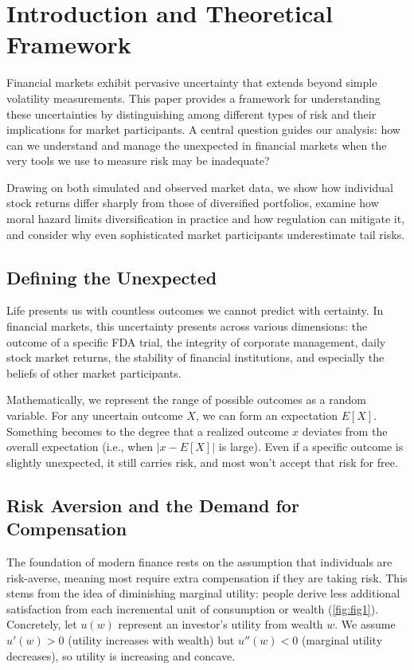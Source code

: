 \section{Introduction and Theoretical Framework}

Financial markets exhibit pervasive uncertainty that extends beyond simple volatility measurements. This paper provides a framework for understanding these uncertainties by distinguishing among different types of risk and their implications for market participants. A central question guides our analysis: how can we understand and manage the unexpected in financial markets when the very tools we use to measure risk may be inadequate?

Drawing on both simulated and observed market data, we show how individual stock returns differ sharply from those of diversified portfolios, examine how moral hazard limits diversification in practice and how regulation can mitigate it, and consider why even sophisticated market participants underestimate tail risks.

\subsection{Defining the Unexpected}
Life presents us with countless outcomes we cannot predict with certainty. In financial markets, this uncertainty presents across various dimensions: the outcome of a specific FDA trial, the integrity of corporate management, daily stock market returns, the stability of financial institutions, and especially the beliefs of other market participants.

Mathematically, we represent the range of possible outcomes as a random variable. For any uncertain outcome $X$, we can form an expectation $E[X]$. Something becomes  to the degree that a realized outcome $x$ deviates from the overall expectation (i.e., when $|x - E[X]|$ is large). Even if a specific outcome is slightly unexpected, it still carries risk, and most won't accept that risk for free.

\subsection{Risk Aversion and the Demand for Compensation}

The foundation of modern finance rests on the assumption that individuals are risk-averse, meaning most require extra compensation if they are taking risk. This stems from the idea of diminishing marginal utility: people derive less additional satisfaction from each incremental unit of consumption or wealth (\autoref{fig:fig1}). Concretely, let $u(w)$ represent an investor’s utility from wealth $w$. We assume $u'(w) > 0$ (utility increases with wealth) but $u''(w) < 0$ (marginal utility decreases), so utility is increasing and concave. 

